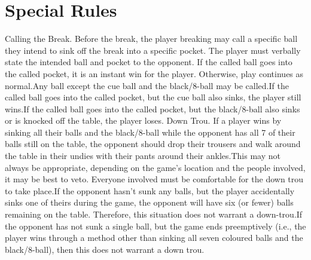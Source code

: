\section{Special Rules} \label{8ball:special}
\label{8ball:callingthebreak} Calling the Break. Before the break, the player breaking may call a specific ball they intend to sink off the break into a specific pocket. The player must verbally state the intended ball and pocket to the opponent. If the called ball goes into the called pocket, it is an instant win for the player. Otherwise, play continues as normal.\standardspace Any ball except the cue ball and the black/8-ball may be called.\standardspace If the called ball goes into the called pocket, but the cue ball also sinks, the player still wins.\standardspace If the called ball goes into the called pocket, but the black/8-ball also sinks or is knocked off the table, the player loses.%
 Down Trou. If a player wins by sinking all their balls and the black/8-ball while the opponent has all 7 of their balls still on the table, the opponent should drop their trousers and walk around the table in their undies with their pants around their ankles.\standardspace This may not always be appropriate, depending on the game's location and the people involved, it may be best to veto. Everyone involved must be comfortable for the down trou to take place.\standardspace If the opponent hasn’t sunk any balls, but the player accidentally sinks one of theirs during the game, the opponent will have six (or fewer) balls remaining on the table. Therefore, this situation does not warrant a down-trou.\standardspace If the opponent has not sunk a single ball, but the game ends preemptively (i.e., the player wins through a method other than sinking all seven coloured balls and the black/8-ball), then this does not warrant a down trou.%

